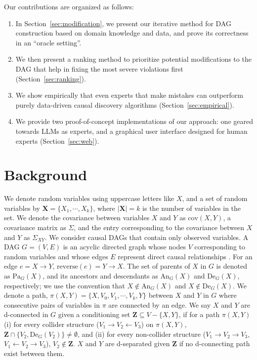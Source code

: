 \documentclass{uai2025} %
\begin{document}
Our contributions are organized as follows:

\begin{enumerate}
    \item In Section~\ref{sec:modification}, we present our iterative method for DAG construction
	based on domain knowledge and data, and prove its correctness in an ``oracle setting''.
    \item We then present a ranking method to prioritize potential modifications to the DAG that 
    	    help in fixing the most severe violations first (Section~\ref{sec:ranking}).
    \item We show empirically that even experts that make mistakes can outperform purely 
	data-driven
	causal discovery algorithms (Section~\ref{sec:empirical}).
    \item We provide two proof-of-concept implementations of our approach: one geared towards
	LLMs as experts, and a graphical user interface designed 
	for human experts (Section~\ref{sec:web}).
\end{enumerate}

\section{Background}
\label{sec:background}
We denote random variables using uppercase letters like $X$, and a set of
random variables by $ \bm{X} = \{X_1, \cdots, X_k\} $, where $ \rvert \bm{X}
\rvert = k $ is the number of variables in the set. We denote the
covariance between variables $ X $ and $ Y $ as $ \mathrm{cov}(X, Y) $, a 
covariance matrix as $ \Sigma $, and the entry corresponding to the covariance
between $ X $ and $ Y $ as $ \Sigma_{XY} $. We consider causal DAGs that contain 
only observed variables. A DAG $ G = (V, E) $ is an acyclic directed graph
whose nodes $ V $ corresponding to random variables and whose edges $ E $ represent
direct causal relationships \cite{Pearl2009}. For an edge $e=X \to Y$, 
$\textrm{reverse}(e)=Y \to X$. The set of parents of $ X $ in $ G $
is denoted as $ \textrm{Pa}_G(X) $, and its ancestors and descendants as $
\textrm{An}_G(X) $ and $ \textrm{De}_G(X) $, respectively; we use the convention
that $X \notin \textrm{An}_G(X)$ and $X \notin \textrm{De}_G(X)$. We denote a path, $
\pi(X, Y) = \{ X, V_0, V_1, \cdots, V_k, Y \} $ between $ X $ and $ Y $ in $ G
$ where consecutive pairs of variables in $ \pi $ are connected by an
edge. We say $ X $ and $ Y $ are d-connected in $ G $ given a conditioning set
$ \bm{Z} \subseteq V - \{X, Y\} $, if for a path $ \pi(X, Y) $ (i) for every
collider structure ($ V_1 \rightarrow V_2 \leftarrow V_3 $) on $ \pi(X, Y) $, $
\bm{Z} \cap \{ V_2, \textrm{De}_G(V_2) \} \ne \emptyset $, and (ii) for every
non-collider structure ($ V_1 \rightarrow V_2 \rightarrow V_3 $, $ V_1
\leftarrow V_2 \rightarrow V_3 $), $ V_2 \not \in \bm{Z} $. $ X $ and $ Y $ are
d-separated given $ \bm{Z} $ if no d-connecting path exist between them.
\end{document}
